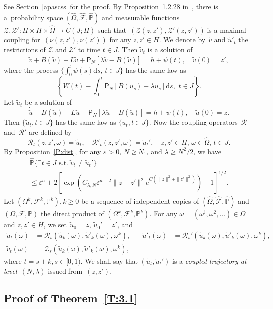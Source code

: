 \documentclass[10pt]{amsart}
\theoremstyle{definition}\newtheorem{defi}[theo]{Definition}\newtheorem{rema}[theo]{Remark}\newtheorem{exam}[theo]{Example}\newtheorem{exem}[theo]{Example}\newtheorem{nota}[theo]{Notation}
\newcommand{\e}{\varepsilon}
\newcommand{\pP}{{\mathbb P}}
\newcommand{\FF}{{\mathcal F}}
\newcommand{\RR}{{\mathcal R}}
\newcommand{\la}{\lambda}
\newcommand{\om}{\omega}
\newcommand{\dd}{\mathrm{d}}
\let\oldexists\exists
\renewcommand*{\exists}{\mathrel{\oldexists}}
\begin{document}
See Section~\ref{apascss} for the proof. By Proposition~1.2.28 in~\cite{KS-book}, there is a~probability space $(\hat \Omega, \hat \FF, \hat\pP)$ and measurable functions $\mathcal{Z}, \mathcal{Z}' :H\times H\times \hat \Omega\to C(J;H) $ such that~$(\mathcal{Z} (z,z'), \mathcal{Z}'(z,z'))$ is a maximal coupling for~$(\nu(z,z'), \nu(z'))$ for any $z,z'\in H$. We denote by~$\tilde v$ and $\tilde u'_t$ the restrictions of $\mathcal{Z}$ and $ \mathcal{Z}' $ to time $t\in J$. Then $\tilde v_t$ is a solution of
\[
\dot {\tilde v} + B(\tilde v) + L\tilde v + {\mathsf P}_N[\la \tilde v-B(\tilde v)] = h +\psi(t), \quad \tilde v (0)= z',
\]
where the process $\{\int_0^t\psi(s)\dd s,\, t\in J\}$ has the same law as
\[
\left\{W(t)- \int_0^t {\mathsf P}_N[B(u_s)-\la u_s]\dd s, \,\, t\in J\right\}.
\]
Let $\tilde u_t$ be a solution of
\[
\dot { \tilde u}+B(\tilde u)+L \tilde u + {\mathsf P}_N[\la \tilde u-B(\tilde u)]=h +\psi(t), \quad \tilde u (0)= z.
\]
Then $\{\tilde u_t, t\in J\}$ has the same law as $\{ u_t, t\in J\}$. Now the coupling operators~$\RR$ and~$\RR'$ are defined by
\[
\RR_t(z,z',\omega)=\tilde u_t,\quad \RR'_t(z,z',\omega)=\tilde u_t', \quad z, z'\in H,\, \omega\in\hat\Omega,\, t\in J.
\]
By Proposition~\ref{P:dist}, for any $\e>0$, $N\ge N_1$, and $\la\ge N^2/2 $, we have
\begin{multline}\label{sdsflklk}
\hat \pP\{\exists t\in J\text{ s.t. } \tilde v_t\neq \tilde u_t' \}\\
\le \e^a+ 2 \left[\exp\left(C_{\la,N} \e^{a-2}\|z-z'\|^2 e^{C(\|z\|^2+\|z'\|^2)} \right)-1\right]^{1/2}.
\end{multline}
Let $(\Omega^k,\FF^k,\pP^k), k\ge0$ be a sequence of independent copies of $(\hat \Omega, \hat \FF, \hat\pP)$ and $(\Omega,\FF,\pP)$ the direct product of $(\Omega^k,\FF^k,\pP^k)$. For any $\omega=(\omega^1,\omega^2,\ldots)\in\Omega$ and $z,z'\in H$, we set~$\tilde u_0=z$, $\tilde u_0'=z'$, and
\begin{align*}
\tilde u_t(\omega)&=\RR_s(\tilde u_{k}(\omega),\tilde u'_{k}(\omega),\omega^k), &\quad
\tilde u'_t(\omega)&=\RR_s'(\tilde u_{k}(\omega),\tilde u'_{k}(\omega),\omega^k), \\\tilde v_t(\om)&=\mathcal{Z}_s(\tilde u_{k}(\omega),\tilde u'_{k}(\omega),\omega^k),
\end{align*}
where $t=s+k, s\in [0,1)$. We shall say that $(\tilde u_t,\tilde u_t')$ is a \emph{coupled trajectory at level}~$(N,\la)$ issued from~$(z,z')$.

\subsection{Proof of Theorem~\ref{T:3.1}}
\end{document}
